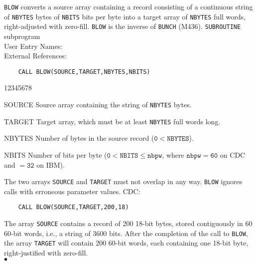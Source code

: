                                
 
\Submitter{}                              
 
{\tt BLOW} converts a source array containing a record consisting of a
continuous string of {\tt NBYTES} bytes of {\tt NBITS} bits per byte
into a target array of {\tt NBYTES} full words, right-adjusted with
zero-fill. {\tt BLOW} is the inverse of {\tt BUNCH} (M436).
\Structure
{\tt SUBROUTINE} subprogram \\
User Entry Names:  \\
External References: 
\Usage
\begin{verbatim}
    CALL BLOW(SOURCE,TARGET,NBYTES,NBITS)
\end{verbatim}
\begin{DLtt}{12345678}
\item [SOURCE] Source array containing the string of {\tt NBYTES} bytes.
\item [TARGET] Target array, which must be at least {\tt NBYTES} full
words long.
\item [NBYTES] Number of bytes in the source record ($\mathtt{0 < NBYTES}$).
\item [NBITS]  Number of bits per byte ($\mathtt{0 < NBITS \leq nbpw}$,
where $\mathtt{nbpw = 60}$ on CDC and $\mathtt{ = 32}$ on IBM).
\end{DLtt}
\Restrict
The two arrays {\tt SOURCE} and {\tt TARGET} must not overlap in any way.
\Errorh
{\tt BLOW} ignores calls with erroneous parameter values.
\Examples
CDC:
\begin{verbatim}
    CALL BLOW(SOURCE,TARGET,200,18)
\end{verbatim}
The array {\tt SOURCE} contains a record of 200 18-bit bytes, stored
contiguously in 60 60-bit words, i.e., a string of 3600 bits. After the
completion of the call to {\tt BLOW}, the array {\tt TARGET} will
contain 200 60-bit words, each containing one 18-bit byte,
right-justified with zero-fill.
\\ $\bullet$
